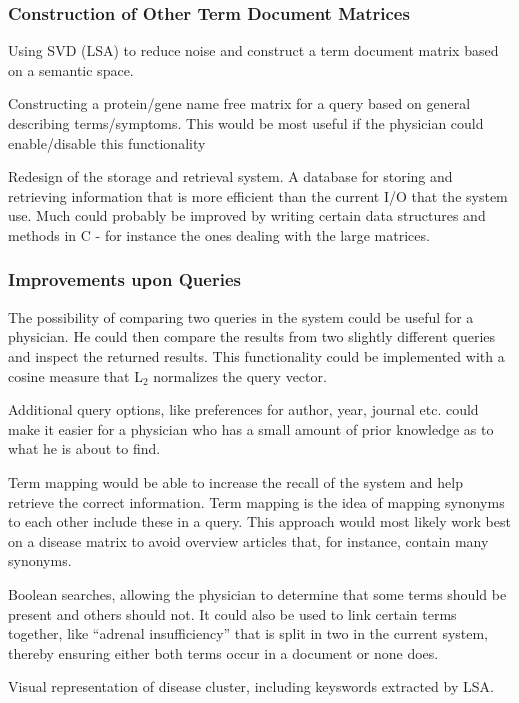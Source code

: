 \subsubsection{Construction of Other Term Document Matrices}
Using SVD (LSA) to reduce noise and construct a term document matrix
based on a semantic space.

Constructing a protein/gene name free matrix for a query based on general describing
terms/symptoms. This would be most useful if the physician could enable/disable this 
functionality

Redesign of the storage and retrieval system. A database for storing and retrieving 
information that is more efficient than the current I/O that the system use. Much
could probably be improved by writing certain data structures and methods in C - 
for instance the ones dealing with the large matrices.

\subsubsection{Improvements upon Queries}
The possibility of comparing two queries in the system could be useful
for a physician. He could then compare the results from two slightly
different queries and inspect the returned results. This functionality
could be implemented with a cosine measure that L$_2$ normalizes the query
vector.

Additional query options, like preferences for author, year, journal
etc. could make it easier for a physician who has a small amount of prior knowledge as to 
what he is about to find.

Term mapping would be able to increase the recall of the system and help retrieve the 
correct information. Term mapping is the idea of mapping synonyms to each other 
include these in a query. This approach would most likely work best on a disease 
matrix to avoid overview articles that, for instance, contain many synonyms.

Boolean searches, allowing the physician to determine that some terms should be present and
others should not. It could also be used to link certain terms together, like ``adrenal
insufficiency'' that is split in two in the current system, thereby ensuring either both
terms occur in a document or none does.

Visual representation of disease cluster, including keyswords extracted by LSA.

